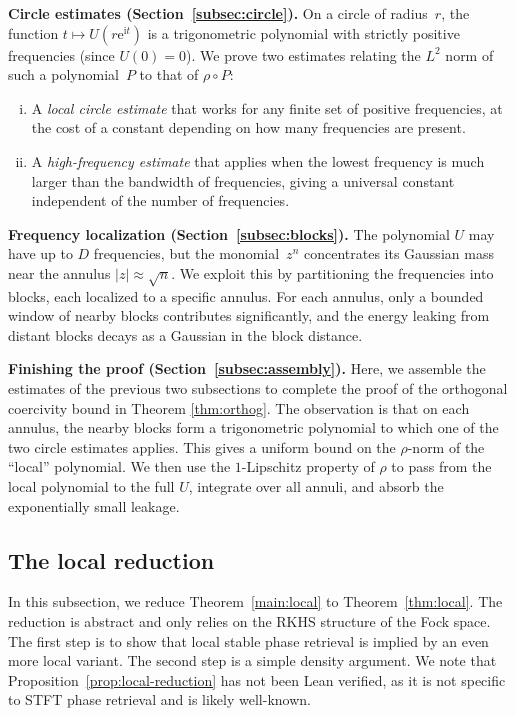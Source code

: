 \documentclass[11pt]{amsart}
\theoremstyle{remark}
\begin{document}
\medskip
\noindent
\textbf{Circle estimates (Section~\ref{subsec:circle}).}\;
On a circle of radius~$r$, the function $t \mapsto U(r\mathrm{e}^{\mathrm{i} t})$ is a
trigonometric polynomial with strictly positive frequencies (since
$U(0) = 0$).  We prove two estimates relating the $L^2$ norm of such a
polynomial~$P$ to that of $\rho \circ P$:
\begin{enumerate}[(i)]
\item A \emph{local circle estimate} that works for any finite set of
  positive frequencies, at the cost of a constant depending on how many
  frequencies are present.

\item A \emph{high-frequency estimate} that applies when the lowest
  frequency is much larger than the bandwidth of frequencies, giving a universal constant
  independent of the number of frequencies.
\end{enumerate}

\medskip
\noindent
\textbf{Frequency localization (Section~\ref{subsec:blocks}).}\; The polynomial $U$ may have up to $D$ frequencies, but the monomial~$z^n$
concentrates its Gaussian mass near the annulus $\lvert z \rvert \approx \sqrt{n}$.
We exploit this by partitioning the frequencies into blocks, each localized
to a specific annulus.  For each annulus, only a bounded window of nearby
blocks contributes significantly, and the energy leaking from distant blocks
decays as a Gaussian in the block distance.

\medskip
\noindent
\textbf{Finishing the proof (Section~\ref{subsec:assembly}).}\;
Here, we assemble the estimates of the previous two subsections to complete the proof of the orthogonal coercivity bound in Theorem \ref{thm:orthog}. The observation is that on each annulus, the nearby blocks form a trigonometric polynomial to which
one of the two circle estimates applies.  This gives a uniform bound on the
$\rho$-norm of the ``local'' polynomial.  We then use the $1$-Lipschitz
property of $\rho$ to pass from the local polynomial to the full $U$,
integrate over all annuli, and absorb the exponentially small leakage.

\subsection{The local reduction}\label{subsec:local-reduction}
In this subsection, we  reduce Theorem~\ref{main:local} to Theorem~\ref{thm:local}. The reduction is abstract and only relies on the RKHS structure of  the Fock space. The first step is to show that local stable phase retrieval is implied by an
even more local variant. The second step is a simple density argument. We note that Proposition~\ref{prop:local-reduction} has not been Lean verified, as it is not specific to STFT phase retrieval and is likely well-known.
\end{document}
